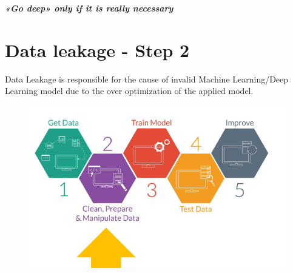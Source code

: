 \documentclass{report}
\begin{document}
\noindent \textbf{\textit{«Go deep» only if it is really necessary }}


\section{Data leakage - Step 2}
\noindent Data Leakage is responsible for the cause of invalid Machine Learning/Deep Learning model due to the over optimization of the applied model.
\begin{figure}[H]
    \centering
    \includegraphics[width=0.8\linewidth]{images/step2.png}
\end{figure}
\end{document}
